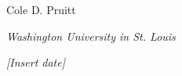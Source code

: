 \vspace{20pt}

\begin{flushright}
  Cole D. Pruitt
\end{flushright}

\textit{Washington University in St. Louis}

\textit{[Insert date]}

\clearpage
